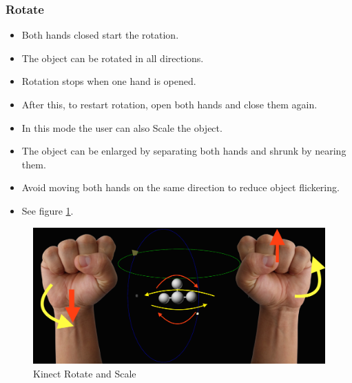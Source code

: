 \documentclass[12pt]{extarticle}
\begin{document}
\begin{appendices}
\subsubsection {Rotate}\label{app:subsubsec Rot}
\begin{itemize}
\item Both hands closed start the rotation.\\
\item The object can be rotated in all directions.\\
\item Rotation stops when one hand is opened. \\
\item After this, to restart rotation, open both hands and close them again.\\
\item In this mode the user can also Scale the object. \\
\item The object can be enlarged by separating both hands and shrunk by nearing them.\\
\item Avoid moving both hands on the same direction to reduce object flickering.\\
\item See figure \ref{fig: AKR}.
\end{itemize}
\begin{center}
\begin{figure}[!h]
\includegraphics[scale=0.4]{Images/KinectRotate.png}
\caption{Kinect Rotate and Scale}
\label{fig: AKR}
\end{figure}
\end{center}

\end{appendices}
\end{document}
